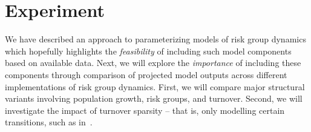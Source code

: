 \documentclass[10pt]{article}
\numberwithin{equation}{section}
\begin{document}
\section{Experiment}\label{s:exp}
We have described an approach to parameterizing models of risk group dynamics
which hopefully highlights the
\textit{feasibility} of including such model components based on available data.
Next, we will explore the
\textit{importance} of including these components
through comparison of projected model outputs
across different implementations of risk group dynamics.
First, we will compare major structural variants
involving population growth, risk groups, and turnover.
Second, we will investigate the impact of turnover sparsity
-- that is, only modelling certain transitions,
such as in~\cite{Eaton2014}.
\end{document}
